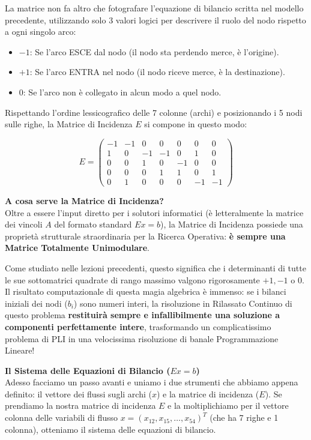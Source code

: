\documentclass[12pt, a4paper]{article}
\begin{document}
	La matrice non fa altro che fotografare l'equazione di bilancio scritta nel modello precedente, utilizzando solo 3 valori logici per descrivere il ruolo del nodo rispetto a ogni singolo arco:
	\begin{itemize}[label=$\circ$, itemsep=2pt, leftmargin=1.5cm]
		\item \textbf{$-1$}: Se l'arco ESCE dal nodo (il nodo sta perdendo merce, è l'origine).
		\item \textbf{$+1$}: Se l'arco ENTRA nel nodo (il nodo riceve merce, è la destinazione).
		\item \textbf{$0$}: Se l'arco non è collegato in alcun modo a quel nodo.
	\end{itemize}
	
	Rispettando l'ordine lessicografico delle 7 colonne (archi) e posizionando i 5 nodi sulle righe, la Matrice di Incidenza $E$ si compone in questo modo:
	
	\[
	E = 
	\begin{pmatrix}
		-1 & -1 & 0 & 0 & 0 & 0 & 0 \\ %
		1 & 0 & -1 & -1 & 0 & 1 & 0 \\ %
		0 & 0 & 1 & 0 & -1 & 0 & 0 \\ %
		0 & 0 & 0 & 1 & 1 & 0 & 1 \\ %
		0 & 1 & 0 & 0 & 0 & -1 & -1 %
	\end{pmatrix}
	\]
	
	\textbf{A cosa serve la Matrice di Incidenza?}\\
	Oltre a essere l'input diretto per i solutori informatici (è letteralmente la matrice dei vincoli $A$ del formato standard $Ex = b$), la Matrice di Incidenza possiede una proprietà strutturale straordinaria per la Ricerca Operativa: \textbf{è sempre una Matrice Totalmente Unimodulare}. 
	
	Come studiato nelle lezioni precedenti, questo significa che i determinanti di tutte le sue sottomatrici quadrate di rango massimo valgono rigorosamente $+1, -1$ o $0$. 
	Il risultato computazionale di questa magia algebrica è immenso: se i bilanci iniziali dei nodi ($b_i$) sono numeri interi, la risoluzione in Rilassato Continuo di questo problema \textbf{restituirà sempre e infallibilmente una soluzione a componenti perfettamente intere}, trasformando un complicatissimo problema di PLI in una velocissima risoluzione di banale Programmazione Lineare!
	
	\vspace{0.4cm}
	\textbf{Il Sistema delle Equazioni di Bilancio ($Ex = b$)}\\
	Adesso facciamo un passo avanti e uniamo i due strumenti che abbiamo appena definito: il vettore dei flussi sugli archi ($x$) e la matrice di incidenza ($E$). 
	Se prendiamo la nostra matrice di incidenza $E$ e la moltiplichiamo per il vettore colonna delle variabili di flusso $x = (x_{12}, x_{15}, \dots, x_{54})^T$ (che ha 7 righe e 1 colonna), otteniamo il sistema delle equazioni di bilancio.
	
\end{document}
